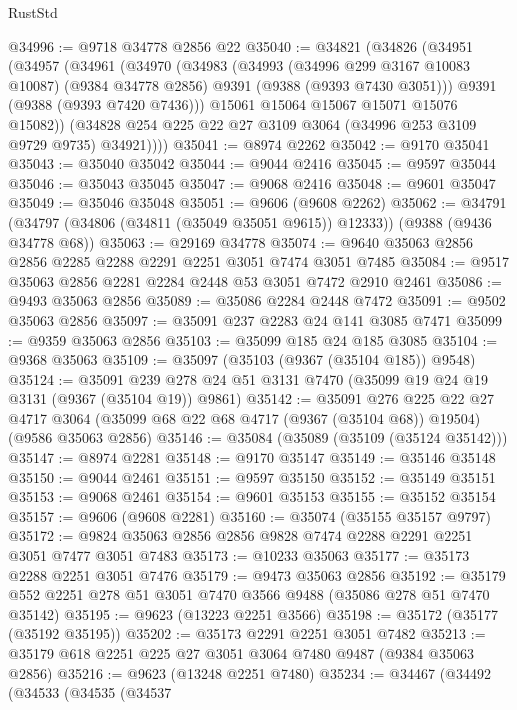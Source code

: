 \begin{lexlean}{RustStd}
\begin{coremodule}
@34996 := @9718 @34778 @2856 @22
@35040 := @34821
    (@34826
      (@34951
        (@34957
          (@34961
            (@34970
              (@34983
                (@34993
                  (@34996 @299 @3167 @10083 @10087)
                  (@9384 @34778 @2856)
                  @9391
                  (@9388 (@9393 @7430 @3051)))
                @9391
                (@9388 (@9393 @7420 @7436)))
              @15061
              @15064
              @15067
              @15071
              @15076
              @15082))
          (@34828 @254 @225 @22 @27 @3109 @3064 (@34996 @253 @3109 @9729 @9735) @34921))))
@35041 := @8974 @2262
@35042 := @9170 @35041
@35043 := @35040 @35042
@35044 := @9044 @2416
@35045 := @9597 @35044
@35046 := @35043 @35045
@35047 := @9068 @2416
@35048 := @9601 @35047
@35049 := @35046 @35048
@35051 := @9606 (@9608 @2262)
@35062 := @34791 (@34797 (@34806 (@34811 (@35049 @35051 @9615)) @12333)) (@9388 (@9436 @34778 @68))
@35063 := @29169 @34778
@35074 := @9640 @35063 @2856 @2856 @2285 @2288 @2291 @2251 @3051 @7474 @3051 @7485
@35084 := @9517 @35063 @2856 @2281 @2284 @2448 @53 @3051 @7472 @2910 @2461
@35086 := @9493 @35063 @2856
@35089 := @35086 @2284 @2448 @7472
@35091 := @9502 @35063 @2856
@35097 := @35091 @237 @2283 @24 @141 @3085 @7471
@35099 := @9359 @35063 @2856
@35103 := @35099 @185 @24 @185 @3085
@35104 := @9368 @35063
@35109 := @35097 (@35103 (@9367 (@35104 @185)) @9548)
@35124 := @35091 @239 @278 @24 @51 @3131 @7470 (@35099 @19 @24 @19 @3131 (@9367 (@35104 @19)) @9861)
@35142 := @35091
    @276
    @225
    @22
    @27
    @4717
    @3064
    (@35099 @68 @22 @68 @4717 (@9367 (@35104 @68)) @19504)
    (@9586 @35063 @2856)
@35146 := @35084 (@35089 (@35109 (@35124 @35142)))
@35147 := @8974 @2281
@35148 := @9170 @35147
@35149 := @35146 @35148
@35150 := @9044 @2461
@35151 := @9597 @35150
@35152 := @35149 @35151
@35153 := @9068 @2461
@35154 := @9601 @35153
@35155 := @35152 @35154
@35157 := @9606 (@9608 @2281)
@35160 := @35074 (@35155 @35157 @9797)
@35172 := @9824 @35063 @2856 @2856 @9828 @7474 @2288 @2291 @2251 @3051 @7477 @3051 @7483
@35173 := @10233 @35063
@35177 := @35173 @2288 @2251 @3051 @7476
@35179 := @9473 @35063 @2856
@35192 := @35179 @552 @2251 @278 @51 @3051 @7470 @3566 @9488 (@35086 @278 @51 @7470 @35142)
@35195 := @9623 (@13223 @2251 @3566)
@35198 := @35172 (@35177 (@35192 @35195))
@35202 := @35173 @2291 @2251 @3051 @7482
@35213 := @35179 @618 @2251 @225 @27 @3051 @3064 @7480 @9487 (@9384 @35063 @2856)
@35216 := @9623 (@13248 @2251 @7480)
@35234 := @34467
    (@34492
      (@34533
        (@34535
          (@34537

\end{coremodule}
\end{lexlean}

